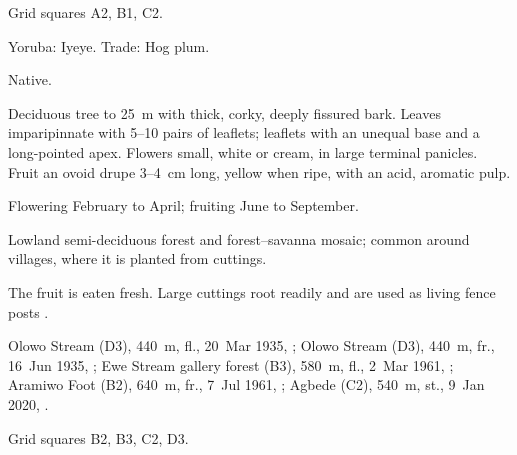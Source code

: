  Grid squares A2, B1, C2.

\begin{center}
\end{center}

\label{sp:ANA02}

 

 Yoruba: Iyeye. Trade: Hog plum.

 Native.

 Deciduous tree to 25~m with thick, corky, deeply
fissured bark. Leaves imparipinnate with 5--10 pairs of leaflets;
leaflets with an unequal base and a long-pointed apex. Flowers small,
white or cream, in large terminal panicles. Fruit an ovoid drupe
3--4~cm long, yellow when ripe, with an acid, aromatic pulp.

 Flowering February to April; fruiting June to
September.

 Lowland semi-deciduous forest and forest--savanna
mosaic; common around villages, where it is planted from cuttings.

 The fruit is eaten fresh. Large cuttings root readily and
are used as living fence posts \citep{keay1989,burkill1985}.

 Olowo Stream (D3), 440~m, fl., 20~Mar 1935, ;
Olowo Stream (D3), 440~m, fr., 16~Jun 1935, ;
Ewe Stream gallery forest (B3), 580~m, fl., 2~Mar 1961, ;
Aramiwo Foot (B2), 640~m, fr., 7~Jul 1961, ;
Agbede (C2), 540~m, st., 9~Jan 2020, .

 Grid squares B2, B3, C2, D3.

\begin{center}
\end{center}